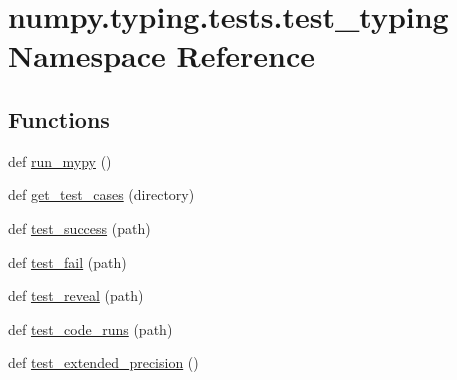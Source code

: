 \hypertarget{namespacenumpy_1_1typing_1_1tests_1_1test__typing}{}\section{numpy.\+typing.\+tests.\+test\+\_\+typing Namespace Reference}
\label{namespacenumpy_1_1typing_1_1tests_1_1test__typing}
\subsection*{Functions}
\begin{DoxyCompactItemize}
\item 
def \hyperlink{namespacenumpy_1_1typing_1_1tests_1_1test__typing_a822dc4c17a7831f04962a1247ca8689f}{run\+\_\+mypy} ()
\item 
def \hyperlink{namespacenumpy_1_1typing_1_1tests_1_1test__typing_ad8ed7f58a377f72e368336608994fe1a}{get\+\_\+test\+\_\+cases} (directory)
\item 
def \hyperlink{namespacenumpy_1_1typing_1_1tests_1_1test__typing_a28f6a7f85d2192dba2378c34b959a836}{test\+\_\+success} (path)
\item 
def \hyperlink{namespacenumpy_1_1typing_1_1tests_1_1test__typing_aac6c2adf6c4e0af7d78174d06a42d0e8}{test\+\_\+fail} (path)
\item 
def \hyperlink{namespacenumpy_1_1typing_1_1tests_1_1test__typing_ae6a85fe694dfe2b5b922869d567d06d2}{test\+\_\+reveal} (path)
\item 
def \hyperlink{namespacenumpy_1_1typing_1_1tests_1_1test__typing_a7c833b024d921886cd5dd72e9bda3074}{test\+\_\+code\+\_\+runs} (path)
\item 
def \hyperlink{namespacenumpy_1_1typing_1_1tests_1_1test__typing_a49e3bddbb04e708d0de7c1df91911700}{test\+\_\+extended\+\_\+precision} ()
\end{DoxyCompactItemize}
